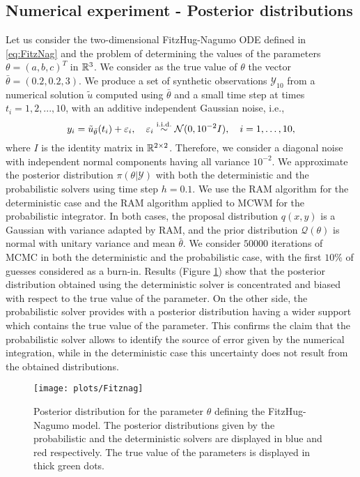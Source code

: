 \subsection{Numerical experiment - Posterior distributions}
Let us consider the two-dimensional FitzHug-Nagumo ODE defined in \eqref{eq:FitzNag} and the problem of determining the values of the parameters $\theta = (a, b, c)^T$ in $\mathbb{R}^3$. We consider as the true value of $\theta$ the vector $\bar \theta = (0.2, 0.2, 3)$. We produce a set of synthetic observations $\mathcal{Y}_{10}$ from a numerical solution $\tilde u$ computed using $\bar \theta$ and a small time step at times $t_i = 1, 2, ..., 10$, with an additive independent Gaussian noise, i.e.,
\begin{equation}
	y_i = \tilde u_{\bar\theta}(t_i) + \varepsilon_i, \quad \varepsilon_i \stackrel{\text{i.i.d.}}{\sim} \mathcal N (0, 10^{-2}I), \quad i = 1, \ldots, 10,
\end{equation}
where $I$ is the identity matrix in $\mathbb{R}^{2\times2}$. Therefore, we consider a diagonal noise with independent normal components having all variance $10^{-2}$. We approximate the posterior distribution $\pi(\theta|\mathcal Y)$ with both the deterministic and the probabilistic solvers using time step $h = 0.1$. We use the RAM algorithm for the deterministic case and the RAM algorithm applied to MCWM for the probabilistic integrator. In both cases, the proposal distribution $q(x,y)$ is a Gaussian with variance adapted by RAM, and the prior distribution $\mathcal{Q}(\theta)$ is normal with unitary variance and mean $\bar \theta$. We consider $50000$ iterations of MCMC in both the deterministic and the probabilistic case, with the first $10\%$ of guesses considered as a burn-in. Results (Figure \ref{fig:MCMC_FHN}) show that the posterior distribution obtained using the deterministic solver is concentrated and biased with respect to the true value of the parameter. On the other side, the probabilistic solver provides with a posterior distribution having a wider support which contains the true value of the parameter. This confirms the claim that the probabilistic solver allows to identify the source of error given by the numerical integration, while in the deterministic case this uncertainty does not result from the obtained distributions.

\begin{figure}
	\centering
	\texttt{[image: plots/Fitznag]}
	\caption{Posterior distribution for the parameter $\theta$ defining the FitzHug-Nagumo model. The posterior distributions given by the probabilistic and the deterministic solvers are displayed in blue and red respectively. The true value of the parameters is displayed in thick green dots.}
	\label{fig:MCMC_FHN}
\end{figure}